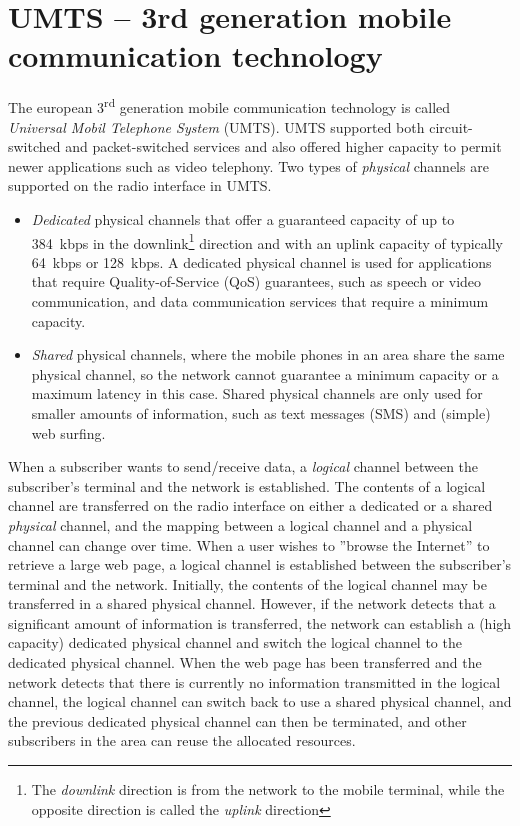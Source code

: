 \section{UMTS -- 3rd generation mobile communication technology}
The european 3\textsuperscript{rd} generation mobile communication technology is called \emph{Universal Mobil Telephone System} (UMTS). UMTS supported both circuit-switched and packet-switched services and also offered higher capacity to permit newer applications such as video telephony. Two types of \emph{physical} channels are supported on the radio interface in UMTS.
\begin{itemize}
%
\item \emph{Dedicated} physical channels that offer a guaranteed capacity of up to 384~kbps in the downlink\footnote{The \emph{downlink} direction is from the network to the mobile terminal, while the opposite direction is called the \emph{uplink} direction} direction and with an uplink capacity of typically 64~kbps or 128~kbps. A dedicated physical channel is used for applications that require Quality-of-Service (QoS) guarantees, such as speech or video communication, and data communication services that require a minimum capacity.
%
\item \emph{Shared} physical channels, where the mobile phones in an area share the same physical channel, so the network cannot guarantee a minimum capacity or a maximum latency in this case. Shared physical channels are only used for smaller amounts of information, such as text messages (SMS) and (simple) web surfing.
%
\end{itemize}

When a subscriber wants to send/receive data, a \emph{logical} channel between the subscriber's terminal and the network is established. The contents of a logical channel are transferred on the radio interface on either a dedicated or a shared \emph{physical} channel, and the mapping between a logical channel and a physical channel can change over time. When a user wishes to ''browse the Internet'' to retrieve a large web page, a logical channel is established between the subscriber's terminal and the network. Initially, the contents of the logical channel may be transferred in a shared physical channel. However, if the network detects that a significant amount of information is transferred, the network can establish a (high capacity) dedicated physical channel and switch the logical channel to the dedicated physical channel. When the web page has been transferred and the network detects that there is currently no information transmitted in the logical channel, the logical channel can switch back to use a shared physical channel, and the previous dedicated physical channel can then be terminated, and other subscribers in the area can reuse the allocated resources.

